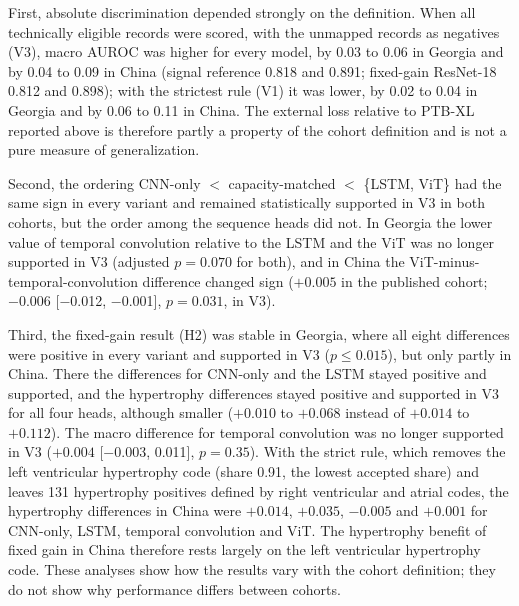 \documentclass{wlscirep}
\begin{document}
First, absolute discrimination depended strongly on the definition. When all technically eligible records were scored, with the unmapped records as negatives (V3), macro AUROC was higher for every model, by 0.03 to 0.06 in Georgia and by 0.04 to 0.09 in China (signal reference 0.818 and 0.891; fixed-gain ResNet-18 0.812 and 0.898); with the strictest rule (V1) it was lower, by 0.02 to 0.04 in Georgia and by 0.06 to 0.11 in China. The external loss relative to PTB-XL reported above is therefore partly a property of the cohort definition and is not a pure measure of generalization.

Second, the ordering CNN-only $<$ capacity-matched $<$ \{LSTM, ViT\} had the same sign in every variant and remained statistically supported in V3 in both cohorts, but the order among the sequence heads did not. In Georgia the lower value of temporal convolution relative to the LSTM and the ViT was no longer supported in V3 (adjusted $p=0.070$ for both), and in China the ViT-minus-temporal-convolution difference changed sign ($+0.005$ in the published cohort; $-0.006$ [$-$0.012, $-$0.001], $p=0.031$, in V3).

Third, the fixed-gain result (H2) was stable in Georgia, where all eight differences were positive in every variant and supported in V3 ($p\le0.015$), but only partly in China. There the differences for CNN-only and the LSTM stayed positive and supported, and the hypertrophy differences stayed positive and supported in V3 for all four heads, although smaller ($+0.010$ to $+0.068$ instead of $+0.014$ to $+0.112$). The macro difference for temporal convolution was no longer supported in V3 ($+0.004$ [$-$0.003, 0.011], $p=0.35$). With the strict rule, which removes the left ventricular hypertrophy code (share 0.91, the lowest accepted share) and leaves 131 hypertrophy positives defined by right ventricular and atrial codes, the hypertrophy differences in China were $+0.014$, $+0.035$, $-0.005$ and $+0.001$ for CNN-only, LSTM, temporal convolution and ViT. The hypertrophy benefit of fixed gain in China therefore rests largely on the left ventricular hypertrophy code. These analyses show how the results vary with the cohort definition; they do not show why performance differs between cohorts.
\end{document}
